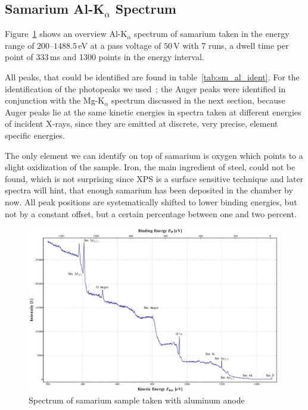 \documentclass[a4paper,10pt]{scrartcl}
\begin{document}
\subsection*{Samarium Al-K$_{\alpha}$ Spectrum}

Figure~\ref{fig:sm_al} shows an overview Al-K$_{\alpha}$ spectrum of samarium taken in the energy range of $200$--$1488.5\,$eV at a pass voltage of $50\,$V with 7 runs, a dwell time per point of $333\,$ms and 1300 points in the energy interval. 

All peaks, that could be identified are found in table~\ref{tab:sm_al_ident}. For the identification of the photopeaks we used~\cite{handbook}; the Auger peaks were identified in conjunction with the Mg-K$_{\alpha}$ spectrum discussed in the next section, because Auger peaks lie at the same kinetic energies in spectra taken at different energies of incident X-rays, since they are emitted at discrete, very precise, element specific energies. 

The only element we can identify on top of samarium is oxygen which points to a slight oxidization of the sample. Iron, the main ingredient of steel, could not be found, which is not surprising since XPS is a surface sensitive technique and later spectra will hint, that enough samarium has been deposited in the chamber by now. All peak positions are systematically shifted to lower binding energies, but not by a constant offset, but a certain percentage between one and two percent.

\begin{figure}[h]
\centering
\includegraphics[scale=0.3]{img/samarium_binding_al}
\caption{Spectrum of samarium sample taken with aluminum anode \label{fig:sm_al}}
\end{figure}
\end{document}
